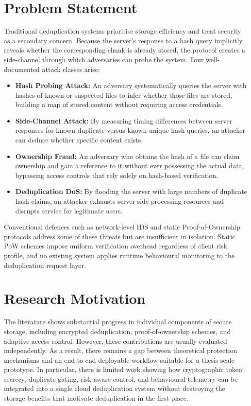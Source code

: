 \documentclass[12pt,a4paper,oneside]{report}
\begin{document}
\section{Problem Statement}

Traditional deduplication systems prioritise storage efficiency and treat security as a secondary concern.
Because the server's response to a hash query implicitly reveals whether the corresponding chunk is already stored, the protocol creates a side-channel through which adversaries can probe the system.
Four well-documented attack classes arise:

\begin{itemize}
  \item \textbf{Hash Probing Attack:} An adversary systematically queries the server with hashes of known or suspected files to infer whether those files are stored, building a map of stored content without requiring access credentials.
  \item \textbf{Side-Channel Attack:} By measuring timing differences between server responses for known-duplicate versus known-unique hash queries, an attacker can deduce whether specific content exists.
  \item \textbf{Ownership Fraud:} An adversary who obtains the hash of a file can claim ownership and gain a reference to it without ever possessing the actual data, bypassing access controls that rely solely on hash-based verification.
  \item \textbf{Deduplication DoS:} By flooding the server with large numbers of duplicate hash claims, an attacker exhausts server-side processing resources and disrupts service for legitimate users.
\end{itemize}

Conventional defences such as network-level IDS and static Proof-of-Ownership protocols address some of these threats but are insufficient in isolation.
Static PoW schemes impose uniform verification overhead regardless of client risk profile, and no existing system applies runtime behavioural monitoring to the deduplication request layer.

\section{Research Motivation}

The literature shows substantial progress in individual components of secure storage, including encrypted deduplication, proof-of-ownership schemes, and adaptive access control.
However, these contributions are usually evaluated independently.
As a result, there remains a gap between theoretical protection mechanisms and an end-to-end deployable workflow suitable for a thesis-scale prototype.
In particular, there is limited work showing how cryptographic token secrecy, duplicate gating, risk-aware control, and behavioural telemetry can be integrated into a single cloud deduplication system without destroying the storage benefits that motivate deduplication in the first place.
\end{document}
